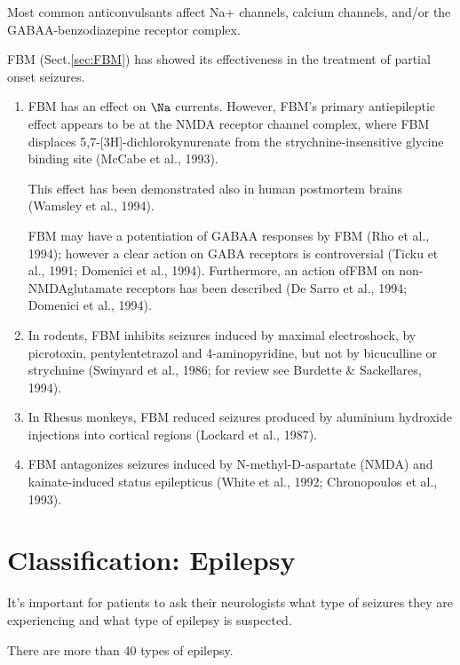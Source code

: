 Most common anticonvulsants affect Na+ channels, calcium channels, and/or the
GABAA-benzodiazepine receptor complex.


FBM (Sect.\ref{sec:FBM}) has showed its effectiveness in the treatment of
partial onset seizures.
\begin{enumerate}
  
  \item FBM has an effect on $\Na$ currents. However, FBM's primary
  antiepileptic effect appears to be at the NMDA receptor channel complex, where
  FBM displaces 5,7-[3H]-dichlorokynurenate from the strychnine-insensitive
  glycine binding site (McCabe et al., 1993).
  
  This effect has been demonstrated also in human postmortem brains (Wamsley et
  al., 1994).

FBM may have a potentiation of GABAA responses by FBM (Rho et al., 1994);
however a clear action on GABA receptors is controversial (Ticku et al., 1991; 
Domenici et al., 1994). Furthermore, an action ofFBM on non-
NMDAglutamate receptors has been described (De Sarro et al.,
1994; Domenici et al., 1994).

  \item  In rodents, FBM inhibits seizures induced by maximal electroshock, by
picrotoxin, pentylentetrazol and 4-aminopyridine, but not by bicuculline or
strychnine (Swinyard et al., 1986; for review see Burdette \& Sackellares,
1994).

  \item In Rhesus monkeys, FBM reduced seizures produced by aluminium hydroxide
injections into cortical regions (Lockard et al., 1987).
  
  \item FBM antagonizes seizures induced by N-methyl-D-aspartate (NMDA) and
  kainate-induced status epilepticus (White et al., 1992; Chronopoulos et al.,
  1993). 
  
  
\end{enumerate}
\section{Classification: Epilepsy}
\label{sec:epilepsy_classification}

It's important for patients to ask their neurologists what type of seizures they
are experiencing and what type of epilepsy is suspected. 

There are more than 40 types of epilepsy.



